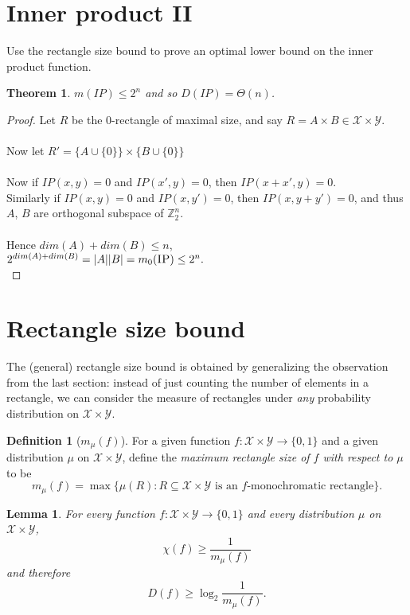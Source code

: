 \documentclass[11pt,oneside]{book}
\theoremstyle{plain}
\newtheorem{theorem}{Theorem}
\newtheorem{lemma}{Lemma}
\theoremstyle{definition}
\newtheorem{definition}{Definition}
\theoremstyle{plain}
\newcommand{\calX}{\mathcal{X}}
\newcommand{\calY}{\mathcal{Y}}
\newcommand{\IP}{\textsc{IP}}
\begin{document}
 \section{Inner product II}

Use the rectangle size bound to prove an optimal lower bound on the inner product function.

\begin{theorem}
	$m(IP) \le 2^{n}$ and so $D(IP) = \Theta(n)$.
\end{theorem}

\begin{proof}
	Let $R$ be the 0-rectangle of maximal size, and say $R=A\times B\in\calX \times \calY$. \\
	 \\
	Now let $R'=\{A\cup\{0\}\}\times\{B\cup\{0\}\}$\\
	 \\
	Now if $IP(x,y) = 0$ and $IP(x',y) = 0$, then $IP(x+x',y) = 0$.\\
	Similarly if $IP(x,y) = 0$ and $IP(x,y') = 0$, then $IP(x,y+y') = 0$, and thus $A$, $B$ are orthogonal subspace of $\mathbb{Z}_2^n$.\\
	 \\
	Hence $dim(A)+dim(B) \leq n$,\\
	$2^{dim(A)+dim(B)} = |A||B| = m_0(\IP) \leq 2^n.$\\
\end{proof}


 \section{Rectangle size bound}

The (general) rectangle size bound is obtained by generalizing the observation from the last section: instead of just counting the number of elements in a rectangle, we can consider the measure of rectangles under \emph{any} probability distribution on $\calX \times \calY$.

\begin{definition}[$m_\mu(f)$]
	For a given function $f : \calX \times \calY \to \{0,1\}$ and a given distribution $\mu$ on $\calX \times \calY$, define the \emph{maximum rectangle size of $f$ with respect to $\mu$} to be
	\[
	m_\mu(f) = \max \{ \mu(R) : R \subseteq \calX \times \calY \mbox{ is an $f$-monochromatic rectangle} \}.
	\]
\end{definition}


\begin{lemma}
	For every function $f : \calX \times \calY \to \{0,1\}$ and every distribution $\mu$ on $\calX \times \calY$, 
	\[
	\chi(f) \ge \frac1{m_\mu(f)}
	\]
	and therefore
	\[
	D(f) \ge \log_2 \frac{1}{m_\mu(f)}.
	\]
\end{lemma}
\end{document}
